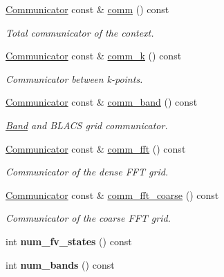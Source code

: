 \begin{DoxyCompactItemize}
\item 
\hyperlink{classsddk_1_1_communicator}{Communicator} const \& \hyperlink{classsirius_1_1_simulation__context_ae55de04ae8ebd7489b70dc2e2b8ff862}{comm} () const 
\begin{DoxyCompactList}\small\item\em Total communicator of the context. \end{DoxyCompactList}\item 
\hyperlink{classsddk_1_1_communicator}{Communicator} const \& \hyperlink{classsirius_1_1_simulation__context_a1449cab4c657410b971ebf347396ec8d}{comm\+\_\+k} () const 
\begin{DoxyCompactList}\small\item\em Communicator between k-\/points. \end{DoxyCompactList}\item 
\hyperlink{classsddk_1_1_communicator}{Communicator} const \& \hyperlink{classsirius_1_1_simulation__context_ae74e0befa4b0dd0fc62ad132704609c2}{comm\+\_\+band} () const 
\begin{DoxyCompactList}\small\item\em \hyperlink{classsirius_1_1_band}{Band} and B\+L\+A\+C\+S grid communicator. \end{DoxyCompactList}\item 
\hyperlink{classsddk_1_1_communicator}{Communicator} const \& \hyperlink{classsirius_1_1_simulation__context_a060c92669da9cdadeb27a3f60e8d3900}{comm\+\_\+fft} () const 
\begin{DoxyCompactList}\small\item\em Communicator of the dense F\+F\+T grid. \end{DoxyCompactList}\item 
\hyperlink{classsddk_1_1_communicator}{Communicator} const \& \hyperlink{classsirius_1_1_simulation__context_ad5ce370b8b7574510be4963e7523d56a}{comm\+\_\+fft\+\_\+coarse} () const 
\begin{DoxyCompactList}\small\item\em Communicator of the coarse F\+F\+T grid. \end{DoxyCompactList}\item 
\hypertarget{classsirius_1_1_simulation__context_a3cc2980eab85a6582c4811cb79c5fe40}{}int {\bfseries num\+\_\+fv\+\_\+states} () const \label{classsirius_1_1_simulation__context_a3cc2980eab85a6582c4811cb79c5fe40}

\item 
\hypertarget{classsirius_1_1_simulation__context_ac0c4513831dd5c62941770e4ae2e53ef}{}int {\bfseries num\+\_\+bands} () const \label{classsirius_1_1_simulation__context_ac0c4513831dd5c62941770e4ae2e53ef}


\end{DoxyCompactItemize}
